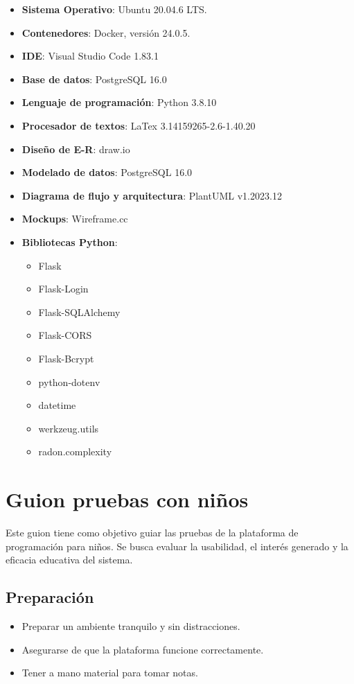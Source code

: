 \begin{appendices}
\begin{itemize}
    \item \textbf{Sistema Operativo}: Ubuntu 20.04.6 LTS.
    \item \textbf{Contenedores}: Docker, versión 24.0.5.
    \item \textbf{IDE}: Visual Studio Code 1.83.1
    \item \textbf{Base de datos}: PostgreSQL 16.0
    \item \textbf{Lenguaje de programación}: Python 3.8.10
    \item \textbf{Procesador de textos}: LaTex 3.14159265-2.6-1.40.20
    \item \textbf{Diseño de E-R}: draw.io
    \item \textbf{Modelado de datos}: PostgreSQL 16.0
    \item \textbf{Diagrama de flujo y arquitectura}: PlantUML v1.2023.12
    \item \textbf{Mockups}: Wireframe.cc
    \item \textbf{Bibliotecas Python}:
    \begin{itemize}
        \item Flask \cite{flask}
        \item Flask-Login \cite{flask-login}
        \item Flask-SQLAlchemy \cite{flask-sqlalchemy}
        \item Flask-CORS \cite{flask-cors}
        \item Flask-Bcrypt \cite{flask-bcrypt}
        \item python-dotenv \cite{python-dotenv}
        \item datetime \cite{datetime}
        \item werkzeug.utils \cite{werkzeug}
        \item radon.complexity \cite{radon}
    \end{itemize}
\end{itemize}
    
\chapter{Guion pruebas con niños}

Este guion tiene como objetivo guiar las pruebas de la plataforma de programación para niños. Se busca evaluar la usabilidad, el interés generado y la eficacia educativa del sistema.

\section{Preparación}
\begin{itemize}
    \item Preparar un ambiente tranquilo y sin distracciones.
    \item Asegurarse de que la plataforma funcione correctamente.
    \item Tener a mano material para tomar notas.
\end{itemize}


\end{appendices}
